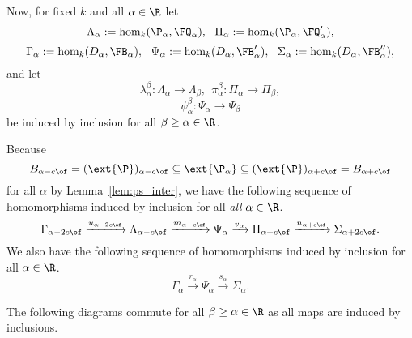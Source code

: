 
Now, for fixed $k$ and all $\alpha\in\R$ let
\[ \Lambda_\alpha := \hom_k(\P_\alpha, \FQ_\alpha),\ \ \Pi_\alpha := \hom_k(\P_\alpha,\FQ_\alpha'),\]
\[ \Gamma_\alpha := \hom_k(D_\alpha, \FB_\alpha),\ \ \Psi_\alpha := \hom_k(D_\alpha, \FB_\alpha'),\ \ \Sigma_\alpha:= \hom_k(D_\alpha, \FB_\alpha''),\]
and let
\[\lambda_\alpha^\beta : \Lambda_\alpha\to \Lambda_\beta,\ \ \pi_\alpha^\beta : \Pi_\alpha\to \Pi_\beta,\]
\[\psi_\alpha^\beta : \Psi_\alpha\to \Psi_\beta\]
be induced by inclusion for all $\beta\geq\alpha\in\R$.

Because
\[B_{\alpha-c\of} = (\ext{\P})_{\alpha-c\of}\subseteq\ext{\P_{\alpha}}\subseteq (\ext{\P})_{\alpha+c\of} = B_{\alpha+c\of}\]
for all $\alpha$ by Lemma~\ref{lem:ps_inter}, we have the following sequence of homomorphisms induced by inclusion for all \emph{all} $\alpha\in\R$.
\[\Gamma_{\alpha-2c\of}\xrightarrow{u_{\alpha-2c\of}}
  \Lambda_{\alpha-c\of}\xrightarrow{m_{\alpha-c\of}}
  \Psi_\alpha\xrightarrow{v_\alpha}
  \Pi_{\alpha+c\of}\xrightarrow{n_{\alpha+c\of}}
  \Sigma_{\alpha+2c\of}.\]
We also have the following sequence of homomorphisms induced by inclusion for all $\alpha\in\R$.
\[\Gamma_\alpha\xrightarrow{r_\alpha}
  \Psi_{\alpha}\xrightarrow{s_\alpha}
  \Sigma_\alpha. \]

The following diagrams commute for all $\beta\geq\alpha\in\R$ as all maps are induced by inclusions.


